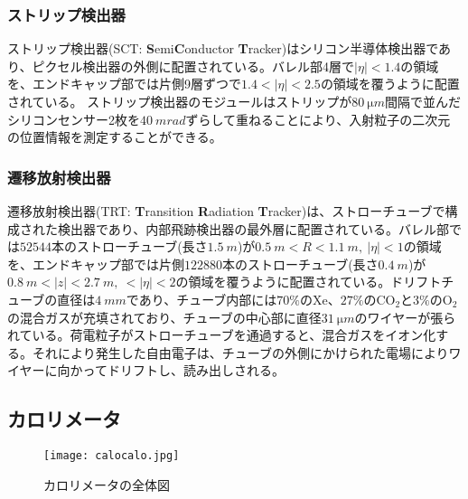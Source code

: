 \subsubsection{ストリップ検出器}
\label{sec:sct}
ストリップ検出器(SCT: \textbf{S}emi\textbf{C}onductor \textbf{T}racker)はシリコン半導体検出器であり、ピクセル検出器の外側に配置されている。バレル部4層で$|\eta|<1.4$の領域を、エンドキャップ部では片側9層ずつで$1.4<|\eta|<2.5$の領域を覆うように配置されている。
ストリップ検出器のモジュールはストリップが$80\ \si{\micro m}$間隔で並んだシリコンセンサー2枚を$40\ \si{m rad}$ずらして重ねることにより、入射粒子の二次元の位置情報を測定することができる。



\subsubsection{遷移放射検出器}
\label{sec:trt}
遷移放射検出器(TRT: \textbf{T}ransition \textbf{R}adiation \textbf{T}racker)は、ストローチューブで構成された検出器であり、内部飛跡検出器の最外層に配置されている。バレル部では$52544$本のストローチューブ(長さ$1.5\ \si{m}$)が$0.5\ \si{m} < R < 1.1\ \si{m},\ |\eta|<1$の領域を、エンドキャップ部では片側$122880$本のストローチューブ(長さ$0.4\ \si{m}$)が$0.8\ \si{m} < |z| < 2.7\ \si{m},\  < |\eta| < 2$の領域を覆うように配置されている。ドリフトチューブの直径は$4\ \si{mm}$であり、チューブ内部には$70\%$のXe、$27\%$のCO$_{2}$と$3\%$のO$_{2}$の混合ガスが充填されており、チューブの中心部に直径$31\ \si{\micro m}$のワイヤーが張られている。荷電粒子がストローチューブを通過すると、混合ガスをイオン化する。それにより発生した自由電子は、チューブの外側にかけられた電場によりワイヤーに向かってドリフトし、読み出しされる。



\subsection{カロリメータ}
\label{sec:calocalo}
\begin{figure}[tbp]
  \centering
  \texttt{[image: calocalo.jpg]}
  \caption[ATLASカロリメータ]{カロリメータの全体図 \cite{calocalo} }
  \label{fig:calocalo}
\end{figure}

